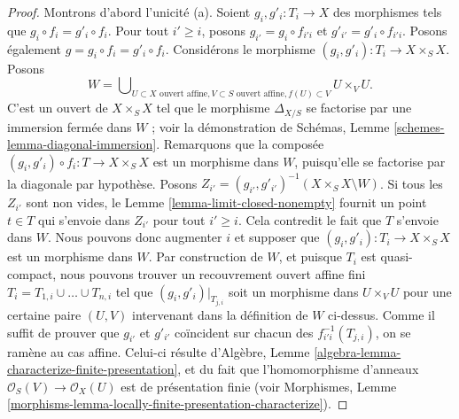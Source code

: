 \begin{proof}
\noindent
Montrons d'abord l'unicité (a). Soient $g_i, g'_i : T_i \to X$ des
morphismes tels que $g_i \circ f_i = g'_i \circ f_i$. Pour tout
$i' \geq i$, posons $g_{i'} = g_i \circ f_{i'i}$ et
$g'_{i'} = g'_i \circ f_{i'i}$. Posons également
$g = g_i \circ f_i = g'_i \circ f_i$. Considérons le morphisme
$(g_i, g'_i) : T_i \to X \times_S X$. Posons
$$
W =
\bigcup\nolimits_{U \subset X\text{ ouvert affine},
V \subset S\text{ ouvert affine}, f(U) \subset V}
U \times_V U.
$$
C'est un ouvert de $X \times_S X$ tel que le morphisme $\Delta_{X/S}$ se
factorise par une immersion fermée dans $W$ ; voir la démonstration de
Schémas, Lemme \ref{schemes-lemma-diagonal-immersion}. Remarquons que la
composée $(g_i, g'_i) \circ f_i : T \to X \times_S X$ est un morphisme dans
$W$, puisqu'elle se factorise par la diagonale par hypothèse. Posons
$Z_{i'} = (g_{i'}, g'_{i'})^{-1}(X \times_S X \setminus W)$. Si tous les
$Z_{i'}$ sont non vides, le Lemme \ref{lemma-limit-closed-nonempty} fournit
un point $t \in T$ qui s'envoie dans $Z_{i'}$ pour tout $i' \geq i$. Cela
contredit le fait que $T$ s'envoie dans $W$. Nous pouvons donc augmenter $i$
et supposer que $(g_i, g'_i) : T_i \to X \times_S X$ est un morphisme dans
$W$. Par construction de $W$, et puisque $T_i$ est quasi-compact, nous
pouvons trouver un recouvrement ouvert affine fini
$T_i = T_{1, i} \cup \ldots \cup T_{n, i}$ tel que
$(g_i, g'_i)|_{T_{j, i}}$ soit un morphisme dans $U \times_V U$ pour une
certaine paire $(U, V)$ intervenant dans la définition de $W$ ci-dessus.
Comme il suffit de prouver que $g_{i'}$ et $g'_{i'}$ coïncident sur chacun
des $f_{i'i}^{-1}(T_{j, i})$, on se ramène au cas affine. Celui-ci résulte
d'Algèbre, Lemme \ref{algebra-lemma-characterize-finite-presentation}, et du
fait que l'homomorphisme d'anneaux
$\mathcal{O}_S(V) \to \mathcal{O}_X(U)$ est de présentation finie (voir
Morphismes,
Lemme \ref{morphisms-lemma-locally-finite-presentation-characterize}).


\end{proof}
